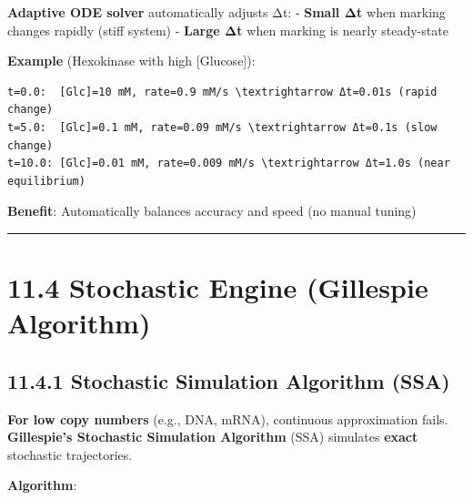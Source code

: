 \textbf{Adaptive ODE solver} automatically adjusts Δt: - \textbf{Small
Δt} when marking changes rapidly (stiff system) - \textbf{Large Δt} when
marking is nearly steady-state

\textbf{Example} (Hexokinase with high {[}Glucose{]}):

\begin{lstlisting}
t=0.0:  [Glc]=10 mM, rate=0.9 mM/s \textrightarrow Δt=0.01s (rapid change)
t=5.0:  [Glc]=0.1 mM, rate=0.09 mM/s \textrightarrow Δt=0.1s (slow change)
t=10.0: [Glc]=0.01 mM, rate=0.009 mM/s \textrightarrow Δt=1.0s (near equilibrium)
\end{lstlisting}

\textbf{Benefit}: Automatically balances accuracy and speed (no manual
tuning)

\begin{center}\rule{0.5\linewidth}{0.5pt}\end{center}

\hypertarget{stochastic-engine-gillespie-algorithm}{%
\section{11.4 Stochastic Engine (Gillespie
Algorithm)}\label{stochastic-engine-gillespie-algorithm}}

\hypertarget{stochastic-simulation-algorithm-ssa}{%
\subsection{11.4.1 Stochastic Simulation Algorithm
(SSA)}\label{stochastic-simulation-algorithm-ssa}}

\textbf{For low copy numbers} (e.g., DNA, mRNA), continuous
approximation fails. \textbf{Gillespie's Stochastic Simulation
Algorithm} (SSA) simulates \textbf{exact} stochastic trajectories.

\textbf{Algorithm}:

